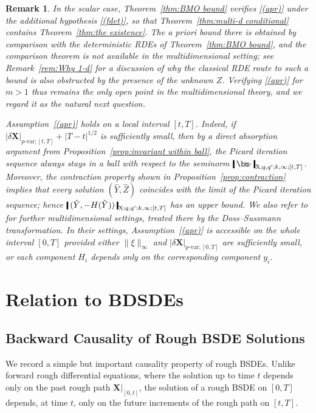 \documentclass[11pt,reqno]{amsart}
\newtheorem{remark}[lemma]{Remark}
\numberwithin{equation}{section}
\newcommand{\shortthickbar}{%
  \vcenter{\hbox{\rule{1.8pt}{2.2ex}}}%
}
\newcommand{\thicknm}[1]{%
  \mathopen{\shortthickbar}%
  \mkern4mu #1 \mkern4mu%
  \mathclose{\shortthickbar}%
}
\begin{document}
\begin{remark}\label{rem:once the a priori estimate is obtained}
In the scalar case, Theorem~\ref{thm:BMO bound} verifies \ref{(apr)} under the additional hypothesis \ref{(fdet)}, so that Theorem~\ref{thm:multi-d conditional} contains Theorem~\ref{thm:the existence}. The \emph{a priori} bound there is obtained by comparison with the deterministic RDEs of Theorem~\ref{thm:BMO bound}, and the comparison theorem is not available in the multidimensional setting; see Remark~\ref{rem:Why 1-d} for a discussion of why the classical RDE route to such a bound is also obstructed by the presence of the unknown $Z$. Verifying \ref{(apr)} for $m>1$ thus remains the only open point in the multidimensional theory, and we regard it as the natural next question. 

Assumption~\ref{(apr)} holds on a local interval $[t,T]$. Indeed, if $|\delta\mathbf X|_{p\text{-}\mathrm{var};[t,T]} + |T-t|^{1/2}$ is sufficiently small, then by a direct absorption argument from Proposition~\ref{prop:invariant within ball}, the Picard iteration sequence always stays in a ball with respect to the seminorm $\thicknm{\bm\cdot}_{\mathrm X;q,q';k,\infty;[t,T]}$. Moreover, the contraction property shown in Proposition~\ref{prop:contraction} implies that every solution $(\hat Y, \hat Z)$ coincides with the limit of the Picard iteration sequence; hence $\thicknm{(\hat Y,- H(\hat Y) )}_{\mathrm X;q,q';k,\infty;[t,T]}$ has an upper bound. 
We also refer to \cite{liang2025multidimensional} for further multidimensional settings, treated there by the Doss--Sussmann transformation. In their settings, Assumption~\ref{(apr)} is accessible on the whole interval $[0,T]$ provided either $\|\xi\|_{\infty}$ and $|\delta\mathbf X|_{p\text{-}\mathrm{var};[0,T]}$ are sufficiently small, or each component $H_i$ depends only on the corresponding component $y_i$.
\end{remark}


\section{Relation to BDSDEs}\label{sec:BDSDEs}

\subsection{Backward Causality of Rough BSDE Solutions}\label{subsec:causality}
We record a simple but important causality property of rough BSDEs.  Unlike
forward rough differential equations, where the solution up to time \(t\)
depends only on the past rough path \(\mathbf X|_{[0,t]}\), the solution of a rough BSDE on
\([0,T]\) depends, at time \(t\), only on the future increments of the rough
path on \([t,T]\).
\end{document}
